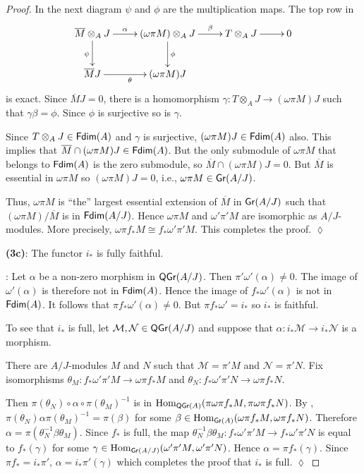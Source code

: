 \documentclass[10pt]{amsart}
\numberwithin{equation}{section}
\def\Hom{\operatorname {Hom}}
\def\Fdim{{\sf Fdim}}
\def\Gr{{\sf Gr}}
\def\Hom{\operatorname{Hom}}
\def\QGr{\operatorname{\sf QGr}}
\def\a{\alpha}
\def\b{\beta}
\def\c{\gamma}
\def\g{\gamma}
\def\cM{{\mathcal M}}
\def\cN{{\mathcal N}}
\begin{document}
\begin{proof}
In the next diagram $\psi$ and $\phi$ are the multiplication maps.
The top row in 
  $$
\UseComputerModernTips
\xymatrix{
\overline{M} \otimes_A J \ar[r]^<<<<<\a  \ar[d]_\psi &  (\omega\pi M) \otimes_A J \ar[r]^<<<<<\b \ar[d]^\phi & T \otimes_A J \ar[r] & 0
\\
\overline{M}J \ar[r]_\theta & (\omega\pi M)J
}
$$
is exact. Since $\overline{M}J=0$, there is a homomorphism $\gamma:T \otimes_A J \to
(\omega \pi M)J$ such that $\gamma\b=\phi$. Since $\phi$ is surjective so is $\c$.

 
Since $T \otimes_A J \in \Fdim(A)$ and $\c$ is surjective, $(\omega \pi M)J \in \Fdim(A)$ also. This
implies that $\overline{M} \cap (\omega \pi M)J \in \Fdim(A)$. But the only submodule of $\omega\pi M$ that belongs to $\Fdim(A)$ is the zero submodule, so $\overline{M} \cap (\omega \pi M)J =0$. But $\overline{M}$ is essential in 
$\omega\pi M$ so  $(\omega \pi M)J=0$, i.e.,  $\omega\pi M \in \Gr(A/J)$.

Thus, $\omega\pi M$ is ``the'' largest essential extension of $\overline{M}$ in $\Gr(A/J)$ such that 
$(\omega\pi M)/\overline{M}$ is in $\Fdim (A/J)$.
Hence $\omega \pi M$ and $\omega'\pi' M$ are isomorphic as $A/J$-modules.  More 
precisely, $\omega \pi f_*M \cong f_*\omega'\pi' M$.  This completes the proof.
$\lozenge$

 {\bf (3c)}: 
The functor $i_*$ is  fully faithful. 

: 
Let $\a$ be a non-zero morphism in $\QGr(A/J)$. Then $\pi'\omega'(\a) \ne 0$. The image of $\omega'(\a)$ is therefore
not in $\Fdim(A)$. Hence the image of $f_*\omega'(\a)$ is not in $\Fdim(A)$. It follows that $\pi f_*\omega'(\a) \ne 0$.
But $\pi f_*\omega'=i_*$ so $i_*$ is faithful. 

To see that $i_*$ is full, let  $\cM,\cN \in \QGr(A/J)$ and suppose that $\a:i_*\cM \to i_*\cN$ is a morphism. 

There are $A/J$-modules $M$ and $N$ such that $\cM=\pi' M$ and $\cN=\pi'N$. 
Fix isomorphisms $\theta_M:f_*\omega'\pi' M \to \omega \pi f_*M$ and $\theta_N:f_*\omega'\pi' N \to \omega \pi f_*N$.

Then  $\pi(\theta_N)\circ \a \circ \pi(\theta_M)^{-1}$ is in $\Hom_{\QGr(A)}(\pi\omega\pi f_*M,\pi\omega\pi f_*N)$.
By \cite[Lemme 1, p.370]{Gab}, $\pi(\theta_N)\a \pi(\theta_M)^{-1}=\pi(\b)$ for some 
$\b \in \Hom_{\Gr(A)}(\omega\pi f_*M,\omega\pi f_*N)$. Therefore  $\a=\pi(\theta_N^{-1}\b\theta_M)$. Since $f_*$ is full,
the map $\theta_N^{-1}\b\theta_M: f_*\omega'\pi' M \to f_*\omega'\pi' N$ is equal to $f_*(\c)$ for some $\g
\in \Hom_{\Gr(A/J)}(\omega'\pi' M,\omega'\pi' N)$. Hence $\a=\pi f_*(\c)$. Since $\pi f_*=i_*\pi'$, $\a=i_*\pi'(\c)$
which completes the proof that $i_*$ is full. 
$\lozenge$




\end{proof}
\end{document}
